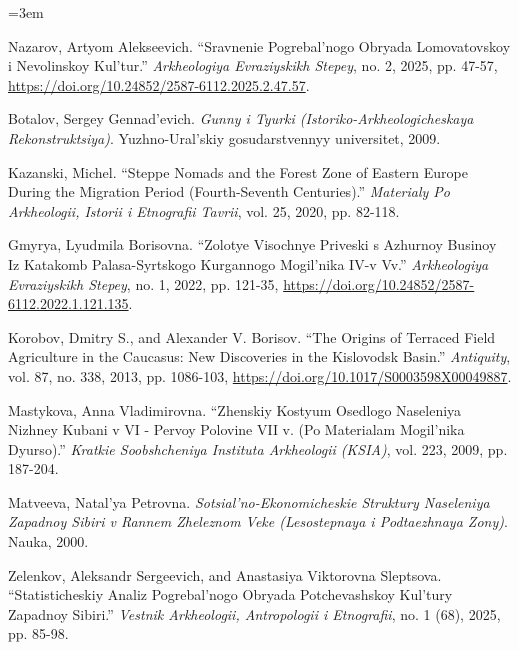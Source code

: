 \documentclass[10pt,onecolumn]{intellte}
\newlength{\csllabelwidth}
\newenvironment{CSLReferences}[2]
 {\par\vspace{2pt}%
  \begin{list}{}{%
  \normalfont\rmfamily\mdseries\fontsize{10pt}{15pt}\selectfont\raggedright
  \hyphenpenalty=50\exhyphenpenalty=50\emergencystretch=3em%
  \renewcommand{\bibitem}[2][]{\item\hypertarget{##2}{}}%
  \setlength{\lineskiplimit}{-6pt}%
  \setlength{\leftmargin}{\csllabelwidth}%
  \setlength{\itemindent}{-\csllabelwidth}%
  \setlength{\labelwidth}{\csllabelwidth}%
  \setlength{\labelsep}{0pt}%
  \setlength{\parsep}{0pt}%
  \setlength{\topsep}{0pt}%
  \setlength{\partopsep}{0pt}%
  \setlength{\itemsep}{2pt}}}
 {\end{list}}
\newcommand{\CSLLeftMargin}[1]{\makebox[\csllabelwidth][l]{\normalfont\rmfamily\mdseries\fontsize{10pt}{15pt}\selectfont #1}}
\newcommand{\CSLRightInline}[1]{\normalfont\rmfamily\mdseries\fontsize{10pt}{15pt}\selectfont #1}
\begin{document}
\begin{CSLReferences}{0}{0}
\CSLLeftMargin{17. }%
\CSLRightInline{Nazarov, Artyom Alekseevich. {``Sravnenie Pogrebal'nogo
Obryada Lomovatovskoy i Nevolinskoy Kul'tur.''} \emph{Arkheologiya
Evraziyskikh Stepey}, no. 2, 2025, pp. 47-57,
\url{https://doi.org/10.24852/2587-6112.2025.2.47.57}.}

\CSLLeftMargin{18. }%
\CSLRightInline{Botalov, Sergey Gennad'evich. \emph{Gunny i Tyurki
(Istoriko-Arkheologicheskaya Rekonstruktsiya)}. Yuzhno-Ural'skiy
gosudarstvennyy universitet, 2009.}

\CSLLeftMargin{19. }%
\CSLRightInline{Kazanski, Michel. {``Steppe Nomads and the Forest Zone
of Eastern Europe During the Migration Period (Fourth-Seventh
Centuries).''} \emph{Materialy Po Arkheologii, Istorii i Etnografii
Tavrii}, vol. 25, 2020, pp. 82-118.}

\CSLLeftMargin{20. }%
\CSLRightInline{Gmyrya, Lyudmila Borisovna. {``Zolotye Visochnye
Priveski s Azhurnoy Businoy Iz Katakomb Palasa-Syrtskogo Kurgannogo
Mogil'nika IV-v Vv.''} \emph{Arkheologiya Evraziyskikh Stepey}, no. 1,
2022, pp. 121-35,
\url{https://doi.org/10.24852/2587-6112.2022.1.121.135}.}

\CSLLeftMargin{21. }%
\CSLRightInline{Korobov, Dmitry S., and Alexander V. Borisov. {``The
Origins of Terraced Field Agriculture in the Caucasus: New Discoveries
in the Kislovodsk Basin.''} \emph{Antiquity}, vol. 87, no. 338, 2013,
pp. 1086-103, \url{https://doi.org/10.1017/S0003598X00049887}.}

\CSLLeftMargin{22. }%
\CSLRightInline{Mastykova, Anna Vladimirovna. {``Zhenskiy Kostyum
Osedlogo Naseleniya Nizhney Kubani v VI - Pervoy Polovine VII v. (Po
Materialam Mogil'nika Dyurso).''} \emph{Kratkie Soobshcheniya Instituta
Arkheologii (KSIA)}, vol. 223, 2009, pp. 187-204.}

\CSLLeftMargin{23. }%
\CSLRightInline{Matveeva, Natal'ya Petrovna.
\emph{Sotsial'no-Ekonomicheskie Struktury Naseleniya Zapadnoy Sibiri v
Rannem Zheleznom Veke (Lesostepnaya i Podtaezhnaya Zony)}. Nauka, 2000.}

\CSLLeftMargin{24. }%
\CSLRightInline{Zelenkov, Aleksandr Sergeevich, and Anastasiya
Viktorovna Sleptsova. {``Statisticheskiy Analiz Pogrebal'nogo Obryada
Potchevashskoy Kul'tury Zapadnoy Sibiri.''} \emph{Vestnik Arkheologii,
Antropologii i Etnografii}, no. 1 (68), 2025, pp. 85-98.}


\end{CSLReferences}
\end{document}
